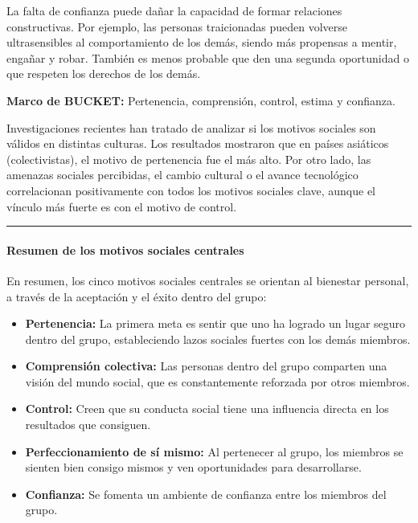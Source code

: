 \documentclass[
]{website}
\begin{document}
La falta de confianza puede dañar la capacidad de formar relaciones constructivas. Por ejemplo, las personas traicionadas pueden volverse ultrasensibles al comportamiento de los demás, siendo más propensas a mentir, engañar y robar. También es menos probable que den una segunda oportunidad o que respeten los derechos de los demás.

\textbf{Marco de BUCKET:} Pertenencia, comprensión, control, estima y confianza.

Investigaciones recientes han tratado de analizar si los motivos sociales son válidos en distintas culturas. Los resultados mostraron que en países asiáticos (colectivistas), el motivo de pertenencia fue el más alto. Por otro lado, las amenazas sociales percibidas, el cambio cultural o el avance tecnológico correlacionan positivamente con todos los motivos sociales clave, aunque el vínculo más fuerte es con el motivo de control.

\begin{center}\rule{0.5\linewidth}{0.5pt}\end{center}

\paragraph*{Resumen de los motivos sociales centrales}\label{subtema2_2_6}

En resumen, los cinco motivos sociales centrales se orientan al bienestar personal, a través de la aceptación y el éxito dentro del grupo:

\begin{itemize}
\item
  \textbf{Pertenencia:} La primera meta es sentir que uno ha logrado un lugar seguro dentro del grupo, estableciendo lazos sociales fuertes con los demás miembros.
\item
  \textbf{Comprensión colectiva:} Las personas dentro del grupo comparten una visión del mundo social, que es constantemente reforzada por otros miembros.
\item
  \textbf{Control:} Creen que su conducta social tiene una influencia directa en los resultados que consiguen.
\item
  \textbf{Perfeccionamiento de sí mismo:} Al pertenecer al grupo, los miembros se sienten bien consigo mismos y ven oportunidades para desarrollarse.
\item
  \textbf{Confianza:} Se fomenta un ambiente de confianza entre los miembros del grupo.
\end{itemize}
\end{document}
